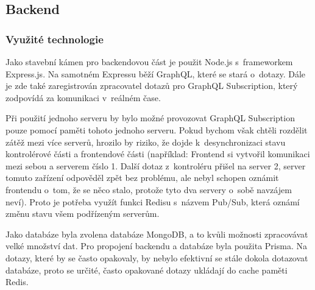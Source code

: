 \subsection{Backend}

\subsubsection{Využité technologie}
Jako stavební kámen pro backendovou část je použit Node.js s~frameworkem Express.js. Na samotném Expressu běží GraphQL, které se stará o~dotazy. Dále je zde také zaregistrován zpracovatel dotazů pro GraphQL Subscription, který zodpovídá za komunikaci v~reálném čase.\par
Při použití jednoho serveru by bylo možné provozovat GraphQL Subscription pouze pomocí paměti tohoto jednoho serveru. Pokud bychom však chtěli rozdělit zátěž mezi více serverů, hrozilo by riziko, že dojde k~desynchronizaci stavu kontrolérové části a frontendové části (například: Frontend si vytvořil komunikaci mezi sebou a serverem číslo 1. Další dotaz z~kontroléru přišel na server 2, server tomuto zařízení odpověděl zpět bez problému, ale nebyl schopen oznámit frontendu o~tom, že se něco stalo, protože tyto dva servery o~sobě navzájem neví). Proto je potřeba využít funkci Redisu s~názvem Pub/Sub\cite{PubSub}, která oznámí změnu stavu všem podřízeným serverům.\par
Jako databáze byla zvolena databáze MongoDB, a to kvůli možnosti zpracovávat velké množství dat. Pro propojení backendu a databáze byla použita Prisma. Na dotazy, které by se často opakovaly, by nebylo efektivní se stále dokola dotazovat databáze, proto se určité, často opakované dotazy ukládají do cache paměti Redis.\par

